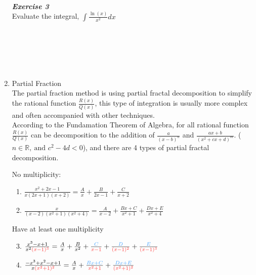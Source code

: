 \documentclass[12px]{article}
\begin{document}
\begin{enumerate}
\begin{multicols}{2}
        \\
        \\
        \\
        \textit{\textbf{Exercise 3}}\\
        Evaluate the integral, $\int \frac{\ln(x)}{x^2}dx$\\
        \\
        \\
        \\
        \\
        \\
    \end{multicols}
\newpage
    \item Partial Fraction\\
    \hspace*{2em}The partial fraction method is using partial fractal decomposition to simplify the rational function $\frac{R(x)}{Q(x)}$, this type of integration is usually more complex and often accompanied with other techniques.\\
    \hspace*{2em}According to the Fundamation Theorem of Algebra, for all rational function $\frac{R(x)}{Q(x)}$ can be decomposition to the addition of $\frac{a}{(x-b)^n}$ and $\frac{ax+b}{(x^2+cx+d)^m}$. ($n\in\mathbb{R},\ \text{and }c^2-4d<0$), and there are 4 types of partial fractal decomposition.\\
    \begin{multicols}{2}
    No multiplicity:
    \begin{enumerate}[(1)]
        \item $\frac{x^2+2x-1}{x(2x+1)(x+2)}=\frac{A}{x}+\frac{B}{2x-1}+\frac{C}{x+2}$
        \item $\frac{x}{(x-2)(x^2+1)(x^2+4)}=\frac{A}{x-2}+\frac{Bx+C}{x^2+1}+\frac{Dx+E}{x^2+4}$
    \end{enumerate}
    Have at least one multiplicity
    \begin{enumerate}[(1)]\setcounter{enumii}{2}
        \item $\frac{x^3-x+1}{x^2\color[rgb]{1,0.18,0.18}{(x-1)^3}}=\frac{A}{x}+\frac{B}{x^2}+\frac{\color[rgb]{0.278,0.639,1}{C}}{\color[rgb]{1,0.18,0.18}{x-1}}+\frac{\color[rgb]{0.278,0.639,1}{D}}{\color[rgb]{1,0.18,0.18}{(x-1)^2}}+\frac{\color[rgb]{0.278,0.639,1}{E}}{\color[rgb]{1,0.18,0.18}{(x-1)^3}}$
        \item $\frac{-x^3+x^2-x+1}{x\color[rgb]{1,0.18,0.18}{(x^2+1)^2}}=\frac{A}{x}+\frac{\color[rgb]{0.278,0.639,1}{Bx+C}}{\color[rgb]{1,0.18,0.18}{x^2+1}}+\frac{\color[rgb]{0.278,0.639,1}{Dx+E}}{\color[rgb]{1,0.18,0.18}{(x^2+1)^2}}$

\end{enumerate}
\end{multicols}
\end{enumerate}
\end{document}
